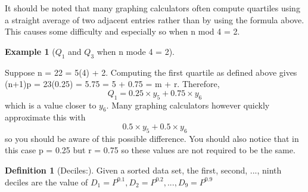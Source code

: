 \documentclass[10pt,]{book}
\theoremstyle{plain}
\theoremstyle{definition}
\newtheorem{definition}[theorem]{Definition}
\theoremstyle{definition}
\newtheorem{example}[theorem]{Example}
\theoremstyle{definition}
\numberwithin{equation}{section}
\begin{document}
It should be noted that many graphing calculators often compute quartiles using a straight average of two adjacent entries rather than by using the formula above. This causes some difficulty and especially so when n mod 4 = 2. 
%
\begin{example}[\(Q_1\) and \(Q_3\) when n mode 4 = 2]\label{example-3}

Suppose n = 22 = 5(4) + 2. Computing the first quartile as defined above gives (n+1)p = 23(0.25) = 5.75 = 5 + 0.75 = m + r.  Therefore,
\begin{equation*}Q_1 = 0.25 \times y_5 + 0.75 \times y_6\end{equation*}
which is a value closer to \(y_6\).  Many graphing calculators however quickly approximate this with
\begin{equation*}0.5 \times y_5 + 0.5 \times y_6\end{equation*}
so you should be aware of this possible difference.  You should also notice that in this case p = 0.25 but r = 0.75 so these values are not required to be the same. 
%
\end{example}
\begin{definition}[{Deciles:}]\label{definition-5}
Given a sorted data set, the first, second, ..., ninth deciles are the value of 
	\(D_1 = P^{0.1}, D_2 = P^{0.2}, ... , D_9 = P^{0.9}\)
\end{definition}
\end{document}
